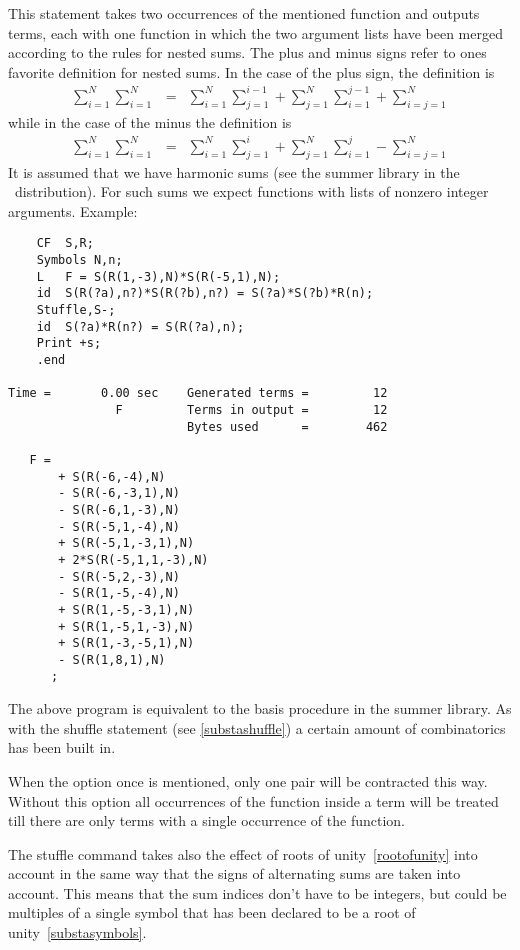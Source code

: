 \noindent This statement 
takes two occurrences of the mentioned function and outputs 
terms, each with one function in which the two argument lists have been 
merged according to the rules for nested sums. The plus and minus signs 
refer to ones favorite definition for nested sums. In the case of the plus 
sign, the definition is
\begin{eqnarray}
    \sum_{i=1}^N \sum_{i=1}^N & = & \sum_{i=1}^N \sum_{j=1}^{i-1}
        + \sum_{j=1}^N \sum_{i=1}^{j-1}
        + \sum_{i=j=1}^N
\end{eqnarray}
\setcounter{equation}{4}
while in the case of the minus the definition is
\begin{eqnarray}
    \sum_{i=1}^N \sum_{i=1}^N & = & \sum_{i=1}^N \sum_{j=1}^{i}
        + \sum_{j=1}^N \sum_{i=1}^{j}
        - \sum_{i=j=1}^N
\end{eqnarray}
\setcounter{equation}{5}
It is assumed that we have harmonic sums (see the 
summer library in the \FORM\ distribution). For such sums we expect 
functions with lists of nonzero integer arguments. Example:
\begin{verbatim}
    CF  S,R;
    Symbols N,n;
    L   F = S(R(1,-3),N)*S(R(-5,1),N);
    id  S(R(?a),n?)*S(R(?b),n?) = S(?a)*S(?b)*R(n);
    Stuffle,S-;
    id  S(?a)*R(n?) = S(R(?a),n);
    Print +s;
    .end

Time =       0.00 sec    Generated terms =         12
               F         Terms in output =         12
                         Bytes used      =        462

   F =
       + S(R(-6,-4),N)
       - S(R(-6,-3,1),N)
       - S(R(-6,1,-3),N)
       - S(R(-5,1,-4),N)
       + S(R(-5,1,-3,1),N)
       + 2*S(R(-5,1,1,-3),N)
       - S(R(-5,2,-3),N)
       - S(R(1,-5,-4),N)
       + S(R(1,-5,-3,1),N)
       + S(R(1,-5,1,-3),N)
       + S(R(1,-3,-5,1),N)
       - S(R(1,8,1),N)
      ;
\end{verbatim}
The above program is equivalent to the basis procedure in the summer 
library. As with the shuffle statement (see 
\ref{substashuffle}) a certain amount of combinatorics has been built in.

When the option once is mentioned, only one pair will be contracted this 
way. Without this option all occurrences of the function inside a term will 
be treated till there are only terms with a single occurrence of the 
function.

The stuffle command takes also the effect of roots of 
unity~\ref{rootofunity} into account in the same way 
that the signs of alternating sums are taken into account. This means that 
the sum indices don't have to be integers, but could be multiples of a 
single symbol that has been declared to be a root of 
unity~\ref{substasymbols}.
\vspace{10mm}
%

